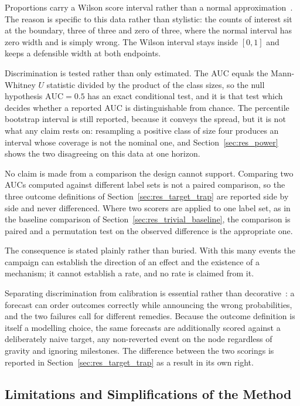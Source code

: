 Proportions carry a Wilson score interval rather than a normal
approximation~\autocite{wilson1927probable}. The reason is specific to this data rather than
stylistic: the counts of interest sit at the boundary, three of three and zero of three, where
the normal interval has zero width and is simply wrong. The Wilson interval stays inside
$[0,1]$ and keeps a defensible width at both endpoints.

Discrimination is tested rather than only estimated. The AUC equals the Mann-Whitney $U$
statistic divided by the product of the class sizes, so the null hypothesis
$\mathrm{AUC} = 0.5$ has an exact conditional test, and it is that test which decides whether
a reported AUC is distinguishable from chance. The percentile bootstrap interval is still
reported, because it conveys the spread, but it is not what any claim rests on: resampling a
positive class of size four produces an interval whose coverage is not the nominal one, and
Section~\ref{sec:res_power} shows the two disagreeing on this data at one horizon.

No claim is made from a comparison the design cannot support. Comparing two AUCs computed
against different label sets is not a paired comparison, so the three outcome definitions of
Section~\ref{sec:res_target_trap} are reported side by side and never differenced. Where two
scorers are applied to one label set, as in the baseline comparison of
Section~\ref{sec:res_trivial_baseline}, the comparison is paired and a permutation test on
the observed difference is the appropriate one.

The consequence is stated plainly rather than buried. With this many events the campaign can
establish the direction of an effect and the existence of a mechanism; it cannot establish a
rate, and no rate is claimed from it.

Separating discrimination from calibration is essential rather than
decorative~\autocite{murphy1973vector}: a forecast can order outcomes correctly while
announcing the wrong probabilities, and the two failures call for different remedies.
Because the outcome definition is itself a modelling choice, the same forecasts are
additionally scored against a deliberately naive target, any non-reverted event on the node
regardless of gravity and ignoring milestones. The difference between the two scorings is
reported in Section~\ref{sec:res_target_trap} as a result in its own right.

\subsection{Limitations and Simplifications of the Method}
\label{sec:methods_limits}

